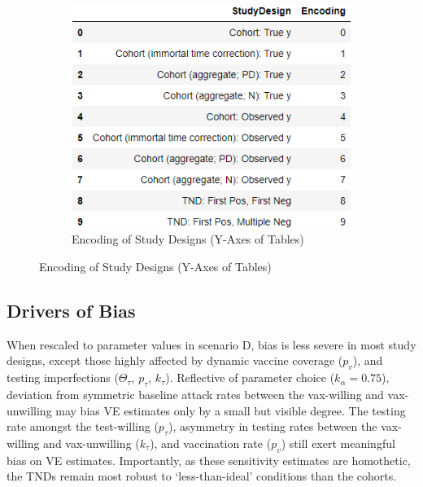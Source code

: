 \documentclass[12pt]{article}
\begin{document}
\begin{figure}[H]
	\begin{subfigure}[t]{0.45\linewidth}
		\centering
		\caption{Encoding of Study Designs (Y-Axes of Tables)}
		\includegraphics[scale=0.6]{VEmethod_RelDirection1b_DictDesign}
	\end{subfigure}
\end{figure}
\subsection{Drivers of Bias}

When rescaled to parameter values in scenario D, bias is less severe in most study designs, except those highly affected by dynamic vaccine coverage ($p_v$), and testing imperfections ($\Theta_{\tau}$, $p_\tau$, $k_\tau$). Reflective of parameter choice ($k_\alpha=0.75$), deviation from symmetric baseline attack rates between the vax-willing and vax-unwilling may bias VE estimates only by a small but visible degree. The testing rate amongst the test-willing ($p_\tau$), asymmetry in testing rates between the vax-willing and vax-unwilling ($k_\tau$), and vaccination rate ($p_v$) still exert meaningful bias on VE estimates. Importantly, as these sensitivity estimates are homothetic, the TNDs remain most robust to `less-than-ideal' conditions than the cohorts.
\end{document}
